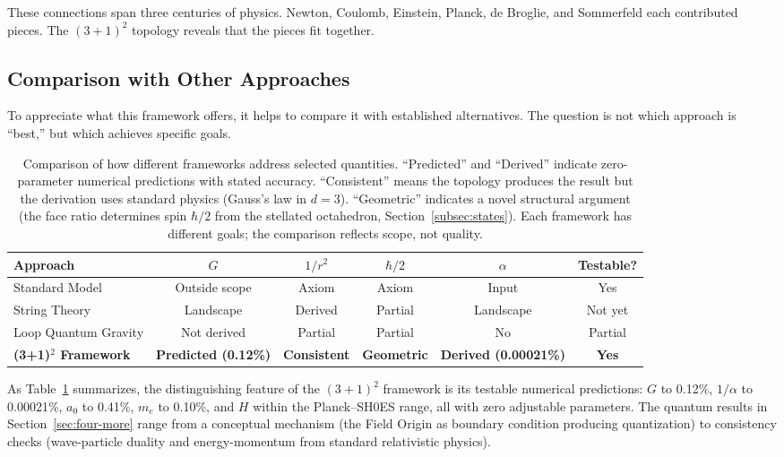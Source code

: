 \documentclass[aps,prd,preprint,superscriptaddress,showpacs,preprintnumbers,amsmath,amssymb,nofootinbib]{revtex4-2}
\begin{document}
These connections span three centuries of physics. Newton, Coulomb, Einstein, Planck, de Broglie, and Sommerfeld each contributed pieces. The $(3+1)^2$ topology reveals that the pieces fit together.

\subsection{Comparison with Other Approaches}
\label{subsec:comparison}

To appreciate what this framework offers, it helps to compare it with established alternatives. The question is not which approach is ``best,'' but which achieves specific goals.

\begin{table}[H]
\centering
\small
\begin{tabular*}{\textwidth}{@{\extracolsep{\fill}} lccccc @{}}
\toprule
\textbf{Approach} & \textbf{$G$} & \textbf{$1/r^2$} & \textbf{$\hbar/2$} & \textbf{$\alpha$} & \textbf{Testable?} \\
\midrule
Standard Model & Outside scope & Axiom & Axiom & Input & Yes \\
String Theory & Landscape & Derived & Partial & Landscape & Not yet \\
Loop Quantum Gravity & Not derived & Partial & Partial & No & Partial \\
\textbf{(3+1)$^2$ Framework} & \textbf{Predicted (0.12\%)} & \textbf{Consistent} & \textbf{Geometric} & \textbf{Derived (0.00021\%)} & \textbf{Yes} \\
\bottomrule
\end{tabular*}
\caption{Comparison of how different frameworks address selected quantities. ``Predicted'' and ``Derived'' indicate zero-parameter numerical predictions with stated accuracy. ``Consistent'' means the topology produces the result but the derivation uses standard physics (Gauss's law in $d = 3$). ``Geometric'' indicates a novel structural argument (the face ratio determines spin $\hbar/2$ from the stellated octahedron, Section~\ref{subsec:states}). Each framework has different goals; the comparison reflects scope, not quality.}
\label{tab:comparison}
\end{table}

As Table~\ref{tab:comparison} summarizes, the distinguishing feature of the $(3+1)^2$ framework is its testable numerical predictions: $G$ to 0.12\%, $1/\alpha$ to 0.00021\%, $a_0$ to 0.41\%, $m_e$ to 0.10\%, and $H$ within the Planck--SH0ES range, all with zero adjustable parameters. The quantum results in Section~\ref{sec:four-more} range from a conceptual mechanism (the Field Origin as boundary condition producing quantization) to consistency checks (wave-particle duality and energy-momentum from standard relativistic physics).
\end{document}
